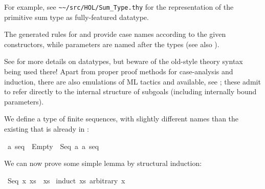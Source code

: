 \begin{isabellebody}
\begin{isamarkuptext}
\begin{description}
  For example, see \verb|~~/src/HOL/Sum_Type.thy| for the
  representation of the primitive sum type as fully-featured datatype.

  \end{description}

  The generated rules for \hyperlink{method.induct}{\mbox{}} and \hyperlink{method.cases}{\mbox{}} provide
  case names according to the given constructors, while parameters are
  named after the types (see also ).

  See \cite{isabelle-HOL} for more details on datatypes, but beware of
  the old-style theory syntax being used there!  Apart from proper
  proof methods for case-analysis and induction, there are also
  emulations of ML tactics \hyperlink{method.HOL.case-tac}{\mbox{}} and \hyperlink{method.HOL.induct-tac}{\mbox{}} available, see ; these admit
  to refer directly to the internal structure of subgoals (including
  internally bound parameters).%
\end{isamarkuptext}%
\isamarkuptrue%
%
\isamarkuptrue%
%
\begin{isamarkuptext}%
We define a type of finite sequences, with slightly different
  names than the existing  that is already in \hyperlink{theory.Main}{\mbox{}}:%
\end{isamarkuptext}%
\isamarkuptrue%
\isamarkupfalse%
\ {}a\ seq\ {}\ Empty\ {}\ Seq\ {}a\ {}{}a\ seq{}%
\begin{isamarkuptext}%
We can now prove some simple lemma by structural induction:%
\end{isamarkuptext}%
\isamarkuptrue%
\isamarkupfalse%
\ {}Seq\ x\ xs\ {}\ xs{}\isanewline
%
\isadelimproof
%
\endisadelimproof
%
\isatagproof
{}\isamarkupfalse%
\ {}induct\ xs\ arbitrary{}\ x{}\isanewline

\end{isabellebody}
